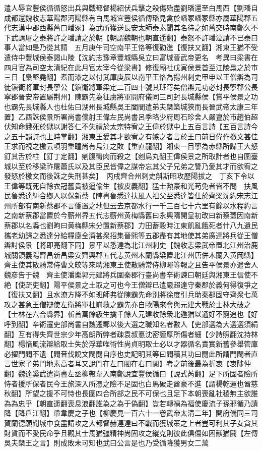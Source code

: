 遣人辱宜豐侯循循怒出兵與戰都督楊紹伏兵擊之殺傷殆盡劉璠還至白馬西【劉璠自成都還魏收志華陽郡沔陽縣有白馬城宜豐侯循傳璠見禽於嶓冢嶓冢縣亦屬華陽郡五代志漢中郡西縣舊曰嶓冢】為武所獲送長安太師泰素聞其名待之如舊交時南鄭久不下武請屠之泰將許之璠請之於朝【朝謂魏朝也朝直遥翻】泰怒不許璠泣請不已泰曰事人當如是乃從其請　五月庚午司空南平王恪等復勸進【復扶又翻】湘東王猶不受遣侍中豐城侯泰謁山陵【沈約志豫章豐城縣吳立曰富城晉武帝更名　考異曰梁書在四月官為司空太清紀在此月官太宰今從梁書】修復廟社戊寅侯景首至江陵梟之於市三日【梟堅堯翻】煮而漆之以付武庫庚辰以南平王恪為揚州刺史甲申以王僧辯為司徒鎭衛將軍封長寧公【鎭衛將軍梁定二百四十號其班穹矣僧辯元功必封長寧郡公長寧郡晉安帝置屬荆州】陳霸先為征虜將軍開府儀同三司封長城縣侯【賞平侯景之功也霸先長城縣人也杜佑曰湖州長城縣吳王闔閭遣弟夫槩築城狹而長晉武帝太康三年置】乙酉誅侯景所署尚書僕射王偉左民尚書呂季略少府周石珍舍人嚴亶於市趙伯超伏知命餓死於獄以謝答仁不失禮於太宗特宥之王偉於獄中上五百言詩【五百言詩今之五十韻詩也上時掌翻】湘東王愛其才欲宥之有嫉之者言於王曰前日偉作檄文甚佳王求而視之檄云項羽重瞳尚有烏江之敗【重直龍翻】湘東一目寧為赤縣所歸王大怒釘其舌於柱【釘丁定翻】剜腹臠肉而殺之【剜烏丸翻王偉侯景之所取計者也自圍臺城以至於移梁祚屠蕭氏以及其臣民皆偉之謀帝忘其父子兄弟之讐乃愛其才而欲宥之發怒於檄文而後誅之失刑甚矣】　丙戌齊合州刺史斛斯昭攻歷陽拔之　丁亥下令以王偉等既死自餘衣冠舊貴被逼偷生【被皮義翻】猛士勲豪和光苟免者皆不問　扶風民魯悉達糾合鄉人以保新蔡【陣書魯悉達扶風人祖父至悉達皆仕於齊梁沈約宋志江州所部有南新蔡郡不言僑置之地但云去京都水行一千三百七十六里有餘以水程約言之南新蔡郡當置於今蘄州界五代志蘄州黄梅縣舊曰永興隋開皇初改曰新蔡蓋因南新蔡郡以名縣也劉昫曰黄梅縣宋分置新蔡郡】力田蓄穀時江東飢亂餓死者什八九遺民攜老幼歸之悉達分給糧廩全濟甚衆招集晉熙等五郡盡有其地使其弟廣達將兵從王僧辯討侯景【將即亮翻下同】景平以悉達為北江州刺史【魏收志梁武帝置北江州治鹿城關領義陽齊昌新昌梁安齊興郡五代志黄州木蘭縣梁置北江州唐併木蘭入黄岡縣】齊主使其散騎常侍曹文皎等來聘湘東王使散騎常侍柳暉等報之且告平侯景亦遣舍人魏彦告于魏　齊主使潘樂郭元建將兵圍秦郡行臺尚書辛術諫曰朝廷與湘東王信使不絶【使疏吏翻】陽平侯景之土取之可也今王僧辯已遣嚴超達守秦郡於義何得復爭之【復扶又翻】且水潦方降不如班師弗從陳霸先命别將徐度引兵助秦郡固守齊衆七萬攻之甚急王僧辯使左衛將軍杜崱救之霸先亦自歐陽來會與元建大戰於士林大破之【士林在六合縣界】斬首萬餘級生擒千餘人元建收餘衆北遁猶以通好不窮追也【好呼到翻】辛術遷吏部尚書自魏遷鄴以後大選之職知名者數人【吏部選為大選選須絹翻】互有得失齊世宗少年高朗所弊者疎袁叔悳沈密謹厚所傷者細【少詩照翻沈持林翻】楊愔風流辯給取士失於浮華唯術性尚貞明取士必以才器循名責實新舊參舉管庫必擢門閥不遺【閥音伐說文閥閱自序也史記明其等曰閥積其功曰閱此所謂門閥者直言世家子弟門地素高者耳又說門在左曰閥在右曰閱】考之前後最為折衷【衷陟仲翻】魏達奚武遣尚書左丞柳帶韋入南鄭說宜豐侯循曰【說式芮翻】足下所固者險所恃者援所保者民今王旅深入所憑之險不足固也白馬破走酋豪不進【謂楊乾運也酋慈秋翻】所望之援不可恃也長圍四合所部之民不可保也且足下本朝喪亂社稷無主欲誰為為忠乎【朝直遥翻喪息浪翻誰為之為于偽翻】豈若轉禍為福使慶流子孫邪循乃請降【降戶江翻】帶韋慶之子也【柳慶見一百六十一卷武帝太清二年】開府儀同三司賀蘭德願聞城中食盡請攻之大都督赫連達曰不戰而獲城策之上者豈可利其子女貪其財貨而不愛民命乎且觀其士馬猶彊精神尚固攻之縱克則彼此俱傷如困獸猶鬪【左傳吳夫槩王之言】則成敗未可知也武曰公言是也乃受循降獲男女二萬
